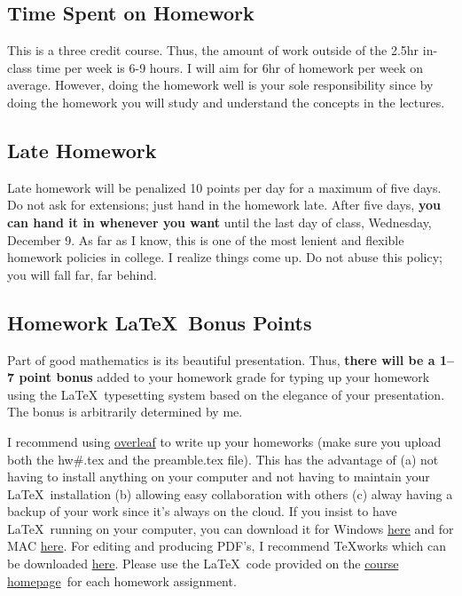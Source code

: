 \documentclass[12pt]{article}
\newcommand{\ingreen}[1]{\color{green}\textbf{#1} \color{black}}
\newcommand{\coursewebpage}{\href{https://github.com/kapelner/QC_Math_621_Fall_2020}{course homepage}}
\begin{document}
\subsection*{Time Spent on Homework }

This is a three credit course. Thus, the amount of work outside of the 2.5hr in-class time per week is 6-9 hours. I will aim for 6hr of homework per week on average. However, doing the homework well is your sole responsibility since by doing the homework you will study and understand the concepts in the lectures.

\subsection*{Late Homework}

Late homework will be penalized 10 points per day for a maximum of five days. Do not ask for extensions; just hand in the homework late. After five days, \textbf{you can hand it in whenever you want} until the last day of class, Wednesday, December 9. As far as I know, this is one of the most lenient and flexible homework policies in college. I realize things come up. Do not abuse this policy; you will fall far, far behind.

\subsection*{Homework \LaTeX~Bonus Points}

Part of good mathematics is its beautiful presentation. Thus, \ingreen{there will be a 1--7 point bonus} added to your homework grade  for typing up your homework using the \LaTeX ~typesetting system based on the elegance of your presentation. The bonus is arbitrarily determined by me.

I recommend using \href{http://overleaf.com}{overleaf} to write up your homeworks (make sure you upload both the hw\#.tex and the preamble.tex file). This has the advantage of (a) not having to install anything on your computer and not having to maintain your \LaTeX ~installation (b) allowing easy collaboration with others (c) alway having a backup of your work since it's always on the cloud. If you insist to have \LaTeX ~running on your computer, you can download it for Windows \href{http://www.miktex.org/download}{here} and for MAC \href{http://www.tug.org/mactex/}{here}. For editing and producing PDF's, I recommend \TeX works which can be downloaded \href{http://www.tug.org/texworks/#Getting_TeXworks}{here}. Please use the \LaTeX ~code provided on the \coursewebpage ~for each homework assignment. 
\end{document}
